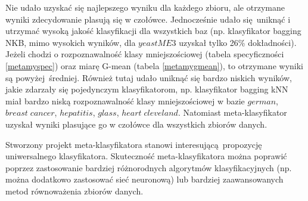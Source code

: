 Nie udało uzyskać się najlepszego wyniku dla każdego zbioru, ale otrzymane wyniki zdecydowanie plasują się w czołówce. Jednocześnie udało się uniknąć i utrzymać wysoką jakość klasyfikacji dla wszystkich baz (np. klasyfikator bagging NKB, mimo wysokich wyników, dla $yeastME3$ uzyskał tylko 26\% dokładności). Jeżeli chodzi o rozpoznawalność klasy mniejszościowej (tabela specyficzności \ref{metamyspec}) oraz miarę G-mean (tabela \ref{metamygmean}), to otrzymane wyniki są powyżej średniej. Również tutaj udało uniknąć się bardzo niskich wyników, jakie zdarzały się pojedynczym klasyfikatorom, np. klasyfikator bagging kNN miał bardzo niską rozpoznawalność klasy mniejszościowej w bazie $german$, $breast\; cancer$, $hepatitis$, $glass$, $heart\; cleveland$. Natomiast meta-klasyfikator uzyskał wyniki plasujące go w czołówce dla wszystkich zbiorów danych. \par
Stworzony projekt meta-klasyfikatora stanowi interesującą propozycję uniwersalnego klasyfikatora. Skuteczność meta-klasyfikatora można poprawić poprzez zastosowanie bardziej różnorodnych algorytmów klasyfikacyjnych (np. można dodatkowo zastosować sieć neuronową) lub bardziej zaawansowanych metod równoważenia zbiorów danych.

	

